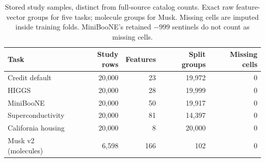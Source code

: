 \begin{table}[t]
\centering\small
\begin{tabular}{lrrrr}
\toprule
Task & Study rows & Features & Split groups & Missing cells \\
\midrule
Credit default & 20,000 & 23 & 19,972 & 0 \\
HIGGS & 20,000 & 28 & 19,999 & 0 \\
MiniBooNE & 20,000 & 50 & 19,917 & 0 \\
Superconductivity & 20,000 & 81 & 14,397 & 0 \\
California housing & 20,000 & 8 & 20,000 & 0 \\
Musk v2 (molecules) & 6,598 & 166 & 102 & 0 \\
\bottomrule
\end{tabular}
\caption{Stored study samples, distinct from full-source catalog counts. Exact raw feature-vector groups for five tasks; molecule groups for Musk. Missing cells are imputed inside training folds. MiniBooNE's retained $-999$ sentinels do not count as missing cells.}
\end{table}
